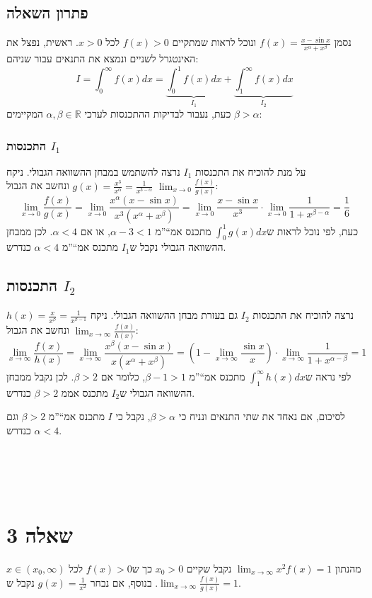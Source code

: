 \documentclass[11pt, oneside]{article}
\newcommand{\qed}{\R{$\blacksquare$}}
\newcommand{\br}{\\\\\\\\\\}
\newcommand{\mR}{\mathbb{R}}
\renewcommand{\l}[3]{\R{למה #3#2.#1}}
\newcommand{\defi}[3]{\int_{#1}^{#2} #3}
\begin{document}
\subsection*{פתרון השאלה}
נסמן $f(x) = \frac{x - \sin{x}}{x^{\alpha} + x^{\beta}}$ ונוכל לראות שמתקיים $f(x) > 0$ לכל $x > 0$. ראשית, נפצל את האינטגרל לשניים ונמצא את התנאים עבור שניהם:
\[
I = \defi{0}{\infty}{f(x)dx}
= \underbrace{\defi{0}{1}{f(x)dx}}_{I_{1}} +
\underbrace{\defi{1}{\infty}{f(x)dx}}_{I_{2}}
\]
כעת, נעבור לבדיקות ההתכנסות לערכי $\alpha, \beta \in \mR$ המקיימים $\beta > \alpha$:

\subsubsection*{התכנסות $I_{1}$}
על מנת להוכיח את התכנסות $I_{1}$ נרצה להשתמש במבחן ההשוואה הגבולי. ניקח $g(x) = \frac{x^{3}}{x^{\alpha}} = \frac{1}{x^{3 - \alpha}}$ ונחשב את הגבול $\lim_{x \to 0} \frac{f(x)}{g(x)}$:
\[
\lim_{x \to 0} \frac{f(x)}{g(x)}
= \lim_{x \to 0} \frac{x^{\alpha}(x - \sin{x})}{x^{3}(x^{\alpha} + x^{\beta})}
= \lim_{x \to 0} \frac{x - \sin{x}}{x^{3}} \cdot \lim_{x \to 0} \frac{1}{1 + x^{\beta - \alpha}}
= \frac{1}{6}
\]
כעת, לפי \l{3}{2}{} נוכל לראות ש$\defi{0}{1}{g(x)dx}$ מתכנס אמ``''מ $\alpha - 3 < 1$, או אם $\alpha < 4$. לכן ממבחן ההשוואה הגבולי נקבל ש$I_{1}$ מתכנס אמ``''מ $\alpha < 4$ כנדרש.

\subsection*{התכנסות $I_{2}$}
נרצה להוכיח את התכנסות $I_{2}$ גם בעזרת מבחן ההשוואה הגבולי. ניקח $h(x) = \frac{x}{x^{\beta}} = \frac{1}{x^{\beta - 1}}$ ונחשב את הגבול $\lim_{x \to \infty} \frac{f(x)}{h(x)}$:
\[
\lim_{x \to \infty} \frac{f(x)}{h(x)}
= \lim_{x \to \infty} \frac{x^{\beta}(x - \sin{x})}{x(x^{\alpha} + x^{\beta})}
= \left(1 - \lim_{x \to \infty} \frac{\sin{x}}{x}\right) \cdot \lim_{x \to \infty} \frac{1}{1 + x^{\alpha - \beta}} = 1
\]
לפי \l{3}{21}{} נראה ש$\defi{1}{\infty}{h(x)dx}$ מתכנס אמ``''מ $\beta - 1 > 1$, כלומר אם $\beta > 2$. לכן נקבל ממבחן ההשוואה הגבולי ש$I_{2}$ מתכנס אממ $\beta > 2$ כנדרש.

לסיכום, אם נאחד את שתי התנאים ונניח כי $\beta > \alpha$, נקבל כי $I$ מתכנס אמ``''מ $\beta > 2$ וגם $\alpha < 4$ כנדרש.
\br\qed
\clearpage

\section*{שאלה 3}
מהנתון $\lim_{x \to \infty} x^{2}f(x) = 1$ נקבל שקיים $x_{0} > 0$ כך ש$f(x) > 0$ לכל $x \in (x_{0}, \infty)$. בנוסף, אם נבחר $g(x) = \frac{1}{x^{2}}$ נקבל ש$\lim_{x \to \infty} \frac{f(x)}{g(x)} = 1$.
\end{document}
